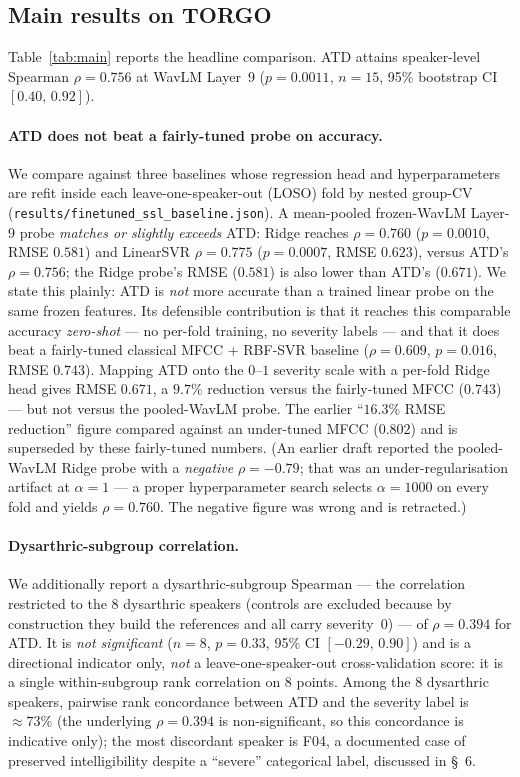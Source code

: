 
\subsection{Main results on TORGO}
\label{sec:main_results}
Table~\ref{tab:main} reports the headline comparison. ATD attains
speaker-level Spearman $\rho = 0.756$ at WavLM Layer~9
($p = 0.0011$, $n = 15$, 95\% bootstrap CI $[0.40,\,0.92]$).
\paragraph{ATD does not beat a fairly-tuned probe on accuracy.}
We compare against three baselines whose regression head and
hyperparameters are refit inside each leave-one-speaker-out (LOSO) fold by
nested group-CV (\texttt{results/finetuned\_ssl\_baseline.json}). A
mean-pooled frozen-WavLM Layer-9 probe \emph{matches or slightly exceeds}
ATD: Ridge reaches $\rho = 0.760$ ($p = 0.0010$, RMSE $0.581$) and
LinearSVR $\rho = 0.775$ ($p = 0.0007$, RMSE $0.623$), versus ATD's
$\rho = 0.756$; the Ridge probe's RMSE ($0.581$) is also lower than ATD's
($0.671$). We state this plainly: ATD is \emph{not} more accurate than a
trained linear probe on the same frozen features. Its defensible
contribution is that it reaches this comparable accuracy \emph{zero-shot}
--- no per-fold training, no severity labels --- and that it does beat a
fairly-tuned classical MFCC + RBF-SVR baseline ($\rho = 0.609$,
$p = 0.016$, RMSE $0.743$). Mapping ATD onto the $0$--$1$ severity scale
with a per-fold Ridge head gives RMSE $0.671$, a $9.7\%$ reduction versus
the fairly-tuned MFCC ($0.743$) --- but not versus the pooled-WavLM probe.
The earlier ``$16.3\%$ RMSE reduction'' figure compared against an
under-tuned MFCC ($0.802$) and is superseded by these fairly-tuned
numbers. (An earlier draft reported the pooled-WavLM Ridge probe with a
\emph{negative} $\rho = -0.79$; that was an under-regularisation artifact
at $\alpha = 1$ --- a proper hyperparameter search selects $\alpha = 1000$
on every fold and yields $\rho = 0.760$. The negative figure was wrong and
is retracted.)
\paragraph{Dysarthric-subgroup correlation.}
We additionally report a dysarthric-subgroup Spearman --- the correlation
restricted to the 8 dysarthric speakers (controls are excluded because by
construction they build the references and all carry severity~0) --- of
$\rho = 0.394$ for ATD. It is \emph{not significant} ($n = 8$, $p = 0.33$,
95\% CI $[-0.29,\,0.90]$) and is a directional indicator only, \emph{not}
a leave-one-speaker-out cross-validation score: it is a single
within-subgroup rank correlation on 8 points.
Among the 8 dysarthric speakers, pairwise rank concordance between ATD and
the severity label is $\approx 73\%$ (the underlying $\rho = 0.394$ is
non-significant, so this concordance is indicative only); the most
discordant speaker is F04, a documented case of preserved intelligibility
despite a ``severe'' categorical label, discussed in \S~6.


